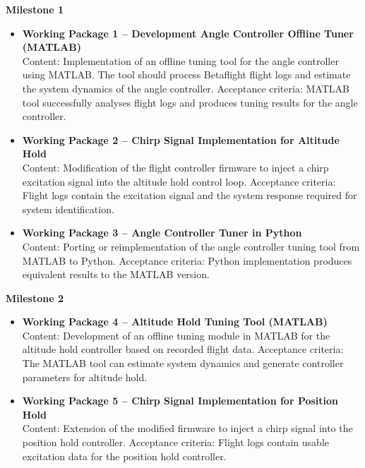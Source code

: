 \documentclass[a4paper,11pt,bibliography=totoc,listof=totoc]{scrreprt}
\begin{document}
\textbf{Milestone 1}
\begin{itemize}


\item \textbf{Working Package 1 – Development Angle Controller Offline Tuner (MATLAB)} \\
Content: Implementation of an offline tuning tool for the angle controller
using MATLAB. The tool should process Betaflight flight logs and estimate
the system dynamics of the angle controller. 
Acceptance criteria: MATLAB tool successfully analyses flight logs and
produces tuning results for the angle controller.

\item \textbf{Working Package 2 – Chirp Signal Implementation for Altitude Hold} \\
Content: Modification of the flight controller firmware to inject a chirp
excitation signal into the altitude hold control loop.
Acceptance criteria: Flight logs contain the excitation signal and the
system response required for system identification.

\item \textbf{Working Package 3 – Angle Controller Tuner in Python} \\
Content: Porting or reimplementation of the angle controller tuning tool
from MATLAB to Python. 
Acceptance criteria: Python implementation produces equivalent results to
the MATLAB version.
\end{itemize}

\textbf{Milestone 2}

\begin{itemize}

\item \textbf{Working Package 4 – Altitude Hold Tuning Tool (MATLAB)} \\
Content: Development of an offline tuning module in MATLAB for the altitude
hold controller based on recorded flight data.
Acceptance criteria: The MATLAB tool can estimate system dynamics and
generate controller parameters for altitude hold.


\item \textbf{Working Package 5 – Chirp Signal Implementation for Position Hold} \\
Content: Extension of the modified firmware to inject a chirp signal into
the position hold controller. 
Acceptance criteria: Flight logs contain usable excitation data for the
position hold controller.

\end{itemize}
\end{document}
